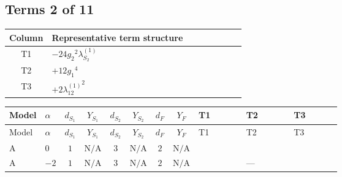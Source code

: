 \documentclass[8pt]{article}
\begin{document}
\begin{landscape}
\subsection*{Terms 2 of 11}
\begin{center}
\begin{tabular}{@{}c >{\raggedright\arraybackslash}p{0.82\linewidth}@{}}
\toprule
Column & Representative term structure \\
\midrule
T1 & \(\displaystyle -24 {g_2}^2 {\lambda_{S_2}^{(1)}}\) \\
\midrule
T2 & \(\displaystyle +12 {g_1}^4\) \\
\midrule
T3 & \(\displaystyle +2 {\lambda_{12}^{(1)}}^2\) \\
\midrule
\bottomrule
\end{tabular}
\end{center}
\smallskip
\tiny
\begin{longtable}{@{}llcccccc >{\raggedright\arraybackslash}p{0.21\linewidth} >{\raggedright\arraybackslash}p{0.21\linewidth} >{\raggedright\arraybackslash}p{0.21\linewidth}@{}}
\toprule
Model & $\alpha$ & $d_{S_1}$ & $Y_{S_1}$ & $d_{S_2}$ & $Y_{S_2}$ & $d_F$ & $Y_F$ & T1 & T2 & T3 \\
\midrule
\endfirsthead
\toprule
Model & $\alpha$ & $d_{S_1}$ & $Y_{S_1}$ & $d_{S_2}$ & $Y_{S_2}$ & $d_F$ & $Y_F$ & T1 & T2 & T3 \\
\midrule
\endhead
A & $0$ & $1$ & $\text{N/A}$ & $3$ & $\text{N/A}$ & $2$ & $\text{N/A}$ & \scriptsize\adjustbox{max width=\linewidth}{$\begin{gathered} -24 {g_2}^2 {\lambda_{S_2}^{(1)}}\end{gathered}$} & \scriptsize\adjustbox{max width=\linewidth}{$\begin{gathered} +12 {g_1}^4\end{gathered}$} & \scriptsize\adjustbox{max width=\linewidth}{$\begin{gathered} +2 {\lambda_{12}^{(1)}}^2\end{gathered}$} \\
\midrule
A & $-2$ & $1$ & $\text{N/A}$ & $3$ & $\text{N/A}$ & $2$ & $\text{N/A}$ & \scriptsize\adjustbox{max width=\linewidth}{$\begin{gathered} -24 {g_2}^2 {\lambda_{S_2}^{(1)}}\end{gathered}$} & --- & \scriptsize\adjustbox{max width=\linewidth}{$\begin{gathered} +2 {\lambda_{12}^{(1)}}^2\end{gathered}$} \\

\end{longtable}
\end{landscape}
\end{document}
